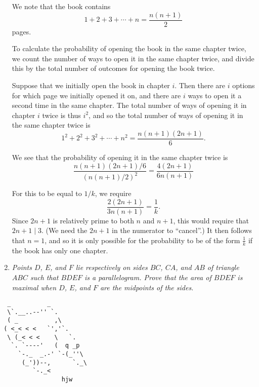 \documentclass{article}
\begin{document}
\begin{enumerate}[1.]
We note that the book contains
\[
  1 + 2 + 3 + \dotsb + n = \frac{n(n + 1)}{2}  
\]
pages.

To calculate the probability of opening the book in the same chapter twice, we count the number of ways to open it in the same chapter twice, and divide this by the total number of outcomes for opening the book twice.

Suppose that we initially open the book in chapter $i$. Then there are $i$ options for which page we initially opened it on, and there are $i$ ways to open it a second time in the same chapter. The total number of ways of opening it in chapter $i$ twice is thus $i^2$, and so the total number of ways of opening it in the same chapter twice is
\[
  1^2 + 2^2 + 3^2 + \dotsb + n^2 = \frac{n(n + 1)(2n + 1)}{6}.
\]

We see that the probability of opening it in the same chapter twice is
\[
  \frac{n(n + 1)(2n + 1)/6}{(n(n + 1)/2)^2} = \frac{4(2n + 1)}{6n(n + 1)}
\]

For this to be equal to $1/k$, we require
\[
  \frac{2(2n + 1)}{3n(n + 1)} = \frac{1}{k}.
\]
Since $2n + 1$ is relatively prime to both $n$ and $n + 1$, this would require that $2n + 1 \mid 3$. (We need the $2n + 1$ in the numerator to ``cancel''.) It then follows that $n = 1$, and so it is only possible for the probability to be of the form $\frac{1}{k}$ if the book has only one chapter.


\item %
{\itshape Points $D$, $E$, and $F$ lie respectively on sides $BC$, $CA$, and $AB$ of triangle $ABC$ such that $BDEF$ is a parallelogram. Prove that the area of $BDEF$ is maximal when $D$, $E$, and $F$ are the midpoints of the sides.}


\end{enumerate}

\vfill
\centering
\begin{BVerbatim}
  _          _
  \`.__..--'' `.
  ( _          ,\
 ( <_< < <   `','`.
  \ (_< < <    \   `.
   `. `----'   (  q _p
     `-._  _.-' `-(_''\
      (_'))--,      `._\
         `-._<
                 hjw
\end{BVerbatim}
\end{document}
